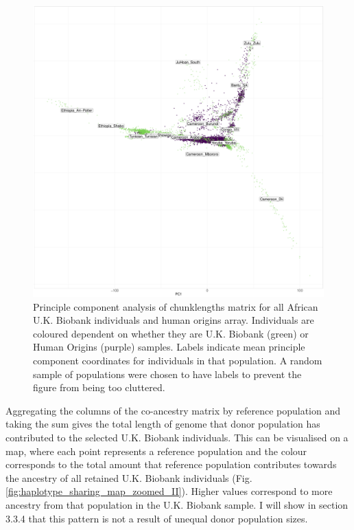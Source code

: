\begin{figure}[htp]
    \centering
    \includegraphics[width=1.0\textwidth]{../images/chapter3/ChromoPainter_PCA_UKB_HO.pdf}
    \caption{Principle component analysis of chunklengths matrix for all African U.K. Biobank individuals and human origins array. Individuals are coloured dependent on whether they are U.K. Biobank (green) or Human Origins (purple) samples. Labels indicate mean principle component coordinates for individuals in that population. A random sample of populations were chosen to have labels to prevent the figure from being too cluttered.}
    \label{fig:PCA_chunklengths_HumanOrigins_U.K.Biobank}
\end{figure}

Aggregating the columns of the co-ancestry matrix by reference population and taking the sum gives the total length of genome that donor population has contributed to the selected U.K. Biobank individuals. This can be visualised on a map, where each point represents a reference population and the colour corresponds to the total amount that reference population contributes towards the ancestry of all retained U.K. Biobank individuals (Fig. \ref{fig:haplotype_sharing_map_zoomed_II}). Higher values correspond to more ancestry from that population in the U.K. Biobank sample. I will show in section 3.3.4 that this pattern is not a result of unequal donor population sizes.

